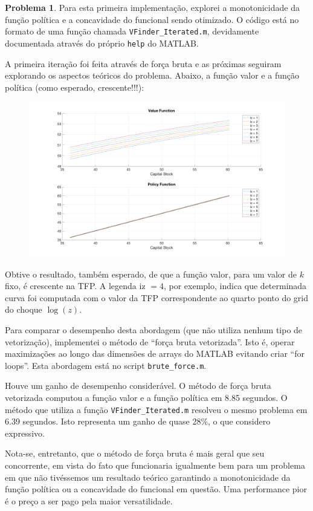 \documentclass[11pt]{article}
\theoremstyle{definition}
\theoremstyle{definition}
\newtheorem{problema}{Problema}
\theoremstyle{solution}
\begin{document}
\begin{problema}
	Para esta primeira implementação, explorei a monotonicidade da função política e a concavidade do funcional sendo otimizado. O código está no formato de uma função chamada \texttt{VFinder\_Iterated.m}, devidamente documentada através do próprio \texttt{help} do MATLAB.
	
	A primeira iteração foi feita através de força bruta e as próximas seguiram explorando os aspectos teóricos do problema. Abaixo, a função valor e a função política (como esperado, crescente!!!):
	\begin{figure}[htb!]
		\centering
		\includegraphics[scale = 0.22]{problem3_V_vs_G}
	\end{figure}
	
	Obtive o resultado, também esperado, de que a função valor, para um valor de $k$ fixo, é crescente na TFP. A legenda iz $= 4$, por exemplo, indica que determinada curva foi computada com o valor da TFP correspondente ao quarto ponto do grid do choque $\log (z)$.
	
	Para comparar o desempenho desta abordagem (que não utiliza nenhum tipo de vetorização), implementei o método de ``força bruta vetorizada''. Isto é, operar maximizações ao longo das dimensões de arrays do MATLAB evitando criar ``for loops''. Esta abordagem está no script \texttt{brute\_force.m}.
	
	Houve um ganho de desempenho considerável. O método de força bruta vetorizada computou a função valor e a função política em 8.85 segundos. O método que utiliza a função \texttt{VFinder\_Iterated.m} resolveu o mesmo problema em 6.39 segundos. Isto representa um ganho de quase 28\%, o que considero expressivo. 
	
	Nota-se, entretanto, que o método de força bruta é mais geral que seu concorrente, em vista do fato que funcionaria igualmente bem para um problema em que não tivéssemos um resultado teórico garantindo a monotonicidade da função política ou a concavidade do funcional em questão. Uma performance pior é o preço a ser pago pela maior versatilidade.

	
	\end{problema}
\end{document}
